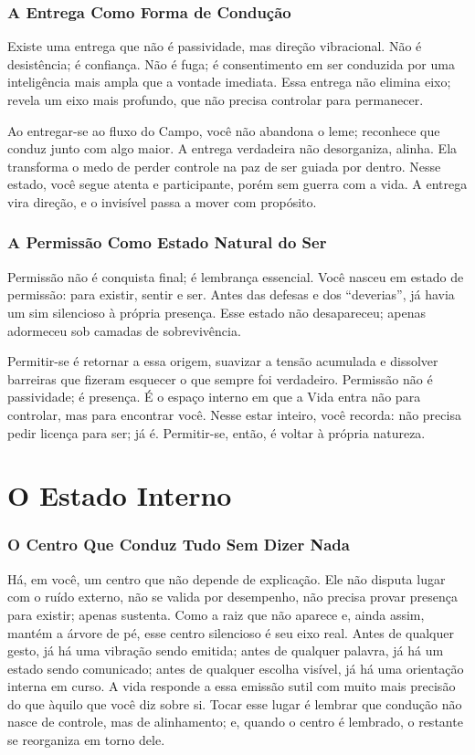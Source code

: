 \documentclass[12pt]{book}
\begin{document}
\subsection*{A Entrega Como Forma de Condução}

Existe uma entrega que não é passividade, mas direção vibracional. Não é desistência; é confiança. Não é fuga; é consentimento em ser conduzida por uma inteligência mais ampla que a vontade imediata. Essa entrega não elimina eixo; revela um eixo mais profundo, que não precisa controlar para permanecer.

Ao entregar-se ao fluxo do Campo, você não abandona o leme; reconhece que conduz junto com algo maior. A entrega verdadeira não desorganiza, alinha. Ela transforma o medo de perder controle na paz de ser guiada por dentro. Nesse estado, você segue atenta e participante, porém sem guerra com a vida. A entrega vira direção, e o invisível passa a mover com propósito.

\subsection*{A Permissão Como Estado Natural do Ser}

Permissão não é conquista final; é lembrança essencial. Você nasceu em estado de permissão: para existir, sentir e ser. Antes das defesas e dos \enquote{deverias}, já havia um sim silencioso à própria presença. Esse estado não desapareceu; apenas adormeceu sob camadas de sobrevivência.

Permitir-se é retornar a essa origem, suavizar a tensão acumulada e dissolver barreiras que fizeram esquecer o que sempre foi verdadeiro. Permissão não é passividade; é presença. É o espaço interno em que a Vida entra não para controlar, mas para encontrar você. Nesse estar inteiro, você recorda: não precisa pedir licença para ser; já é. Permitir-se, então, é voltar à própria natureza.

\chapter{O Estado Interno}

\subsection*{O Centro Que Conduz Tudo Sem Dizer Nada}

Há, em você, um centro que não depende de explicação. Ele não disputa lugar com o ruído externo, não se valida por desempenho, não precisa provar presença para existir; apenas sustenta. Como a raiz que não aparece e, ainda assim, mantém a árvore de pé, esse centro silencioso é seu eixo real. Antes de qualquer gesto, já há uma vibração sendo emitida; antes de qualquer palavra, já há um estado sendo comunicado; antes de qualquer escolha visível, já há uma orientação interna em curso. A vida responde a essa emissão sutil com muito mais precisão do que àquilo que você diz sobre si. Tocar esse lugar é lembrar que condução não nasce de controle, mas de alinhamento; e, quando o centro é lembrado, o restante se reorganiza em torno dele.
\end{document}

